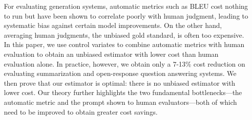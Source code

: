 For evaluating generation systems, automatic metrics such as BLEU cost nothing to run but have been shown to correlate poorly with human judgment, leading to systematic bias against certain model improvements. On the other hand, averaging human judgments, the unbiased gold standard, is often too expensive. In this paper, we use control variates to combine automatic metrics with human evaluation to obtain an unbiased estimator with lower cost than human evaluation alone. In practice, however, we obtain only a 7-13\% cost reduction on evaluating summarization and open-response question answering systems. We then prove that our estimator is optimal: there is no unbiased estimator with lower cost. Our theory further highlights the two fundamental bottlenecks---the automatic metric and the prompt shown to human evaluators---both of which need to be improved to obtain greater cost savings.
